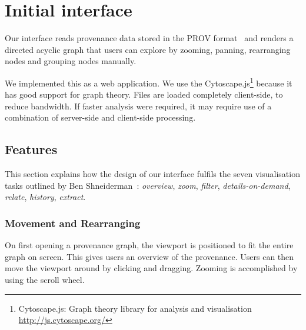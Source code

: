 \chapter{Initial interface}

Our interface reads provenance data stored in the PROV format~\cite{primer2013} and renders a directed acyclic graph that users can explore by zooming, panning, rearranging nodes and grouping nodes manually. 

We implemented this as a web application. We use the Cytoscape.js\footnote{Cytoscape.js: Graph theory library for analysis and visualisation \url{http://js.cytoscape.org/}} because it has good support for graph theory. 
Files are loaded completely client-side, to reduce bandwidth. If faster analysis were required, it may require use of a combination of server-side and client-side processing.


\section{Features}

This section explains how the design of our interface fulfils the seven visualisation tasks outlined by Ben Shneiderman~\cite{Shneiderman1996}: \textit{overview}, \textit{zoom}, \textit{filter}, \textit{details-on-demand}, \textit{relate}, \textit{history}, \textit{extract}. 

\subsection{Movement and Rearranging}
On first opening a provenance graph, the viewport is positioned to fit the entire graph on screen. This gives users an overview of the provenance. Users can then move the viewport around by clicking and dragging. Zooming is accomplished by using the scroll wheel. 


